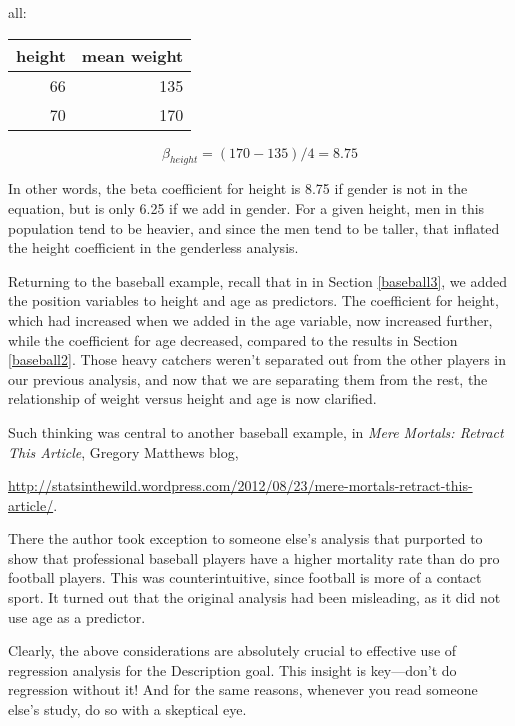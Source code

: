 \bigskip

all:

\begin{tabular}{|r|r|}
\hline
height & mean weight \\ \hline 
66 & 135 \\ \hline 
70 & 170 \\ \hline 
\end{tabular}

\begin{equation}
\beta_{height} = (170-135) / 4 = 8.75
\end{equation}

In other words, the beta coefficient for height is 8.75 if gender is not
in the equation, but is only 6.25 if we add in gender.  For a given
height, men in this population tend to be heavier, and since the men
tend to be taller, that inflated the height coefficient in the
genderless analysis.

Returning to the baseball example, recall that in in Section
\ref{baseball3}, we added the position variables to height and age as
predictors.  The coefficient for height, which had increased when we
added in the age variable, now increased further, while the coefficient
for age decreased, compared to the results in Section \ref{baseball2}.
Those heavy catchers weren't separated out from the other players in our
previous analysis, and now that we are separating them from the rest,
the relationship of weight versus height and age is now clarified.

Such thinking was central to another baseball example, in {\it Mere
Mortals:  Retract This Article}, Gregory Matthews blog, 

\url{http://statsinthewild.wordpress.com/2012/08/23/mere-mortals-retract-this-article/}.

There the author took exception to someone else's analysis that
purported to show that professional baseball players have a higher
mortality rate than do pro football players.  This was counterintuitive,
since football is more of a contact sport.  It turned out that the
original analysis had been misleading, as it did not use age as a
predictor.

Clearly, the above considerations are absolutely crucial to effective
use of regression analysis for the Description goal.  This insight is
key---don't do regression without it!  And for the same reasons,
whenever you read someone else's study, do so with a skeptical eye.

